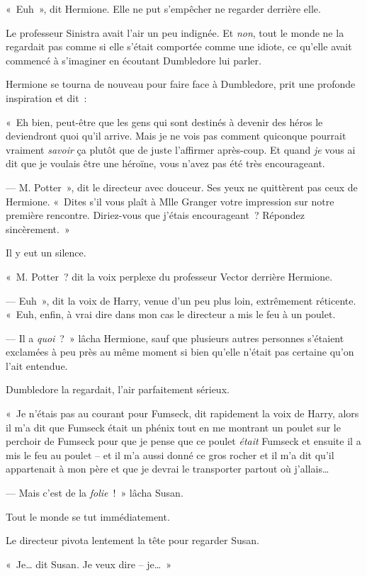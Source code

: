 «~Euh~», dit Hermione. Elle ne put s'empêcher ne regarder derrière elle.

Le professeur Sinistra avait l'air un peu indignée. Et \emph{non}, tout le monde ne la regardait pas comme si elle s'était comportée comme une idiote, ce qu'elle avait commencé à s'imaginer en écoutant Dumbledore lui parler.

Hermione se tourna de nouveau pour faire face à Dumbledore, prit une profonde inspiration et dit~:

«~Eh bien, peut-être que les gens qui sont destinés à devenir des héros le deviendront quoi qu'il arrive. Mais je ne vois pas comment quiconque pourrait vraiment \emph{savoir} ça plutôt que de juste l'affirmer après-coup. Et quand \emph{je} vous ai dit que je voulais être une héroïne, vous n'avez pas été très encourageant.

--- M. Potter~», dit le directeur avec douceur. Ses yeux ne quittèrent pas ceux de Hermione. «~Dites s'il vous plaît à Mlle Granger votre impression sur notre première rencontre. Diriez-vous que j'étais encourageant~? Répondez sincèrement.~»

Il y eut un silence.

«~M. Potter~? dit la voix perplexe du professeur Vector derrière Hermione.

--- Euh~», dit la voix de Harry, venue d'un peu plus loin, extrêmement réticente. «~Euh, enfin, à vrai dire dans mon cas le directeur a mis le feu à un poulet.

--- Il a \emph{quoi}~?~» lâcha Hermione, sauf que plusieurs autres personnes s'étaient exclamées à peu près au même moment si bien qu'elle n'était pas certaine qu'on l'ait entendue.

Dumbledore la regardait, l'air parfaitement sérieux.

«~Je n'étais pas au courant pour Fumseck, dit rapidement la voix de Harry, alors il m'a dit que Fumseck était un phénix tout en me montrant un poulet sur le perchoir de Fumseck pour que je pense que ce poulet \emph{était} Fumseck et ensuite il a mis le feu au poulet -- et il m'a aussi donné ce gros rocher et il m'a dit qu'il appartenait à mon père et que je devrai le transporter partout où j'allais…

--- Mais c'est de la \emph{folie}~!~» lâcha Susan.

Tout le monde se tut immédiatement.

Le directeur pivota lentement la tête pour regarder Susan.

«~Je… dit Susan. Je veux dire -- je…~»

